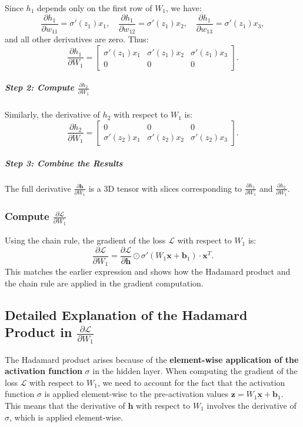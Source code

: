 \begin{notechapter}
Since \( h_1 \) depends only on the first row of \( W_1 \), we have:
\[
\frac{\partial h_1}{\partial w_{11}} = \sigma'(z_1) x_1, \quad \frac{\partial h_1}{\partial w_{12}} = \sigma'(z_1) x_2, \quad \frac{\partial h_1}{\partial w_{13}} = \sigma'(z_1) x_3,
\]
and all other derivatives are zero. Thus:
\[
\frac{\partial h_1}{\partial W_1} = \begin{bmatrix}
\sigma'(z_1) x_1 & \sigma'(z_1) x_2 & \sigma'(z_1) x_3 \\
0 & 0 & 0
\end{bmatrix}.
\]

\subparagraph*{Step 2: Compute \( \frac{\partial h_2}{\partial W_1} \)}

Similarly, the derivative of \( h_2 \) with respect to \( W_1 \) is:
\[
\frac{\partial h_2}{\partial W_1} = \begin{bmatrix}
0 & 0 & 0 \\
\sigma'(z_2) x_1 & \sigma'(z_2) x_2 & \sigma'(z_2) x_3
\end{bmatrix}.
\]

\subparagraph*{Step 3: Combine the Results}
The full derivative \( \frac{\partial \mathbf{h}}{\partial W_1} \) is a 3D tensor with slices corresponding to \( \frac{\partial h_1}{\partial W_1} \) and \( \frac{\partial h_2}{\partial W_1} \).

\subsubsection{Compute \( \frac{\partial \mathcal{L}}{\partial W_1} \)}
Using the chain rule, the gradient of the loss \( \mathcal{L} \) with respect to \( W_1 \) is:
\[
\frac{\partial \mathcal{L}}{\partial W_1} = \frac{\partial \mathcal{L}}{\partial \mathbf{h}} \odot \sigma'(W_1 \mathbf{x} + \mathbf{b}_1) \cdot \mathbf{x}^T.
\]
This matches the earlier expression and shows how the Hadamard product and the chain rule are applied in the gradient computation.

\subsection{Detailed Explanation of the Hadamard Product in \( \frac{\partial \mathcal{L}}{\partial W_1} \)}

The Hadamard product arises because of the \textbf{element-wise application of the activation function} \( \sigma \) in the hidden layer. When computing the gradient of the loss \( \mathcal{L} \) with respect to \( W_1 \), we need to account for the fact that the activation function \( \sigma \) is applied element-wise to the pre-activation values \( \mathbf{z} = W_1 \mathbf{x} + \mathbf{b}_1 \). This means that the derivative of \( \mathbf{h} \) with respect to \( W_1 \) involves the derivative of \( \sigma \), which is applied element-wise.


\end{notechapter}
